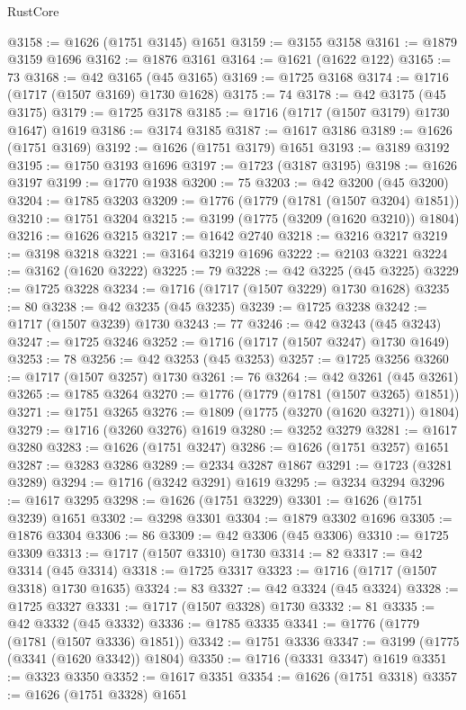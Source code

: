 \begin{lexlean}{RustCore}
\begin{coremodule}
@3158 := @1626 (@1751 @3145) @1651
@3159 := @3155 @3158
@3161 := @1879 @3159 @1696
@3162 := @1876 @3161
@3164 := @1621 (@1622 @122)
@3165 := 73
@3168 := @42 @3165 (@45 @3165)
@3169 := @1725 @3168
@3174 := @1716 (@1717 (@1507 @3169) @1730 @1628)
@3175 := 74
@3178 := @42 @3175 (@45 @3175)
@3179 := @1725 @3178
@3185 := @1716 (@1717 (@1507 @3179) @1730 @1647) @1619
@3186 := @3174 @3185
@3187 := @1617 @3186
@3189 := @1626 (@1751 @3169)
@3192 := @1626 (@1751 @3179) @1651
@3193 := @3189 @3192
@3195 := @1750 @3193 @1696
@3197 := @1723 (@3187 @3195)
@3198 := @1626 @3197
@3199 := @1770 @1938
@3200 := 75
@3203 := @42 @3200 (@45 @3200)
@3204 := @1785 @3203
@3209 := @1776 (@1779 (@1781 (@1507 @3204) @1851))
@3210 := @1751 @3204
@3215 := @3199 (@1775 (@3209 (@1620 @3210)) @1804)
@3216 := @1626 @3215
@3217 := @1642 @2740
@3218 := @3216 @3217
@3219 := @3198 @3218
@3221 := @3164 @3219 @1696
@3222 := @2103 @3221
@3224 := @3162 (@1620 @3222)
@3225 := 79
@3228 := @42 @3225 (@45 @3225)
@3229 := @1725 @3228
@3234 := @1716 (@1717 (@1507 @3229) @1730 @1628)
@3235 := 80
@3238 := @42 @3235 (@45 @3235)
@3239 := @1725 @3238
@3242 := @1717 (@1507 @3239) @1730
@3243 := 77
@3246 := @42 @3243 (@45 @3243)
@3247 := @1725 @3246
@3252 := @1716 (@1717 (@1507 @3247) @1730 @1649)
@3253 := 78
@3256 := @42 @3253 (@45 @3253)
@3257 := @1725 @3256
@3260 := @1717 (@1507 @3257) @1730
@3261 := 76
@3264 := @42 @3261 (@45 @3261)
@3265 := @1785 @3264
@3270 := @1776 (@1779 (@1781 (@1507 @3265) @1851))
@3271 := @1751 @3265
@3276 := @1809 (@1775 (@3270 (@1620 @3271)) @1804)
@3279 := @1716 (@3260 @3276) @1619
@3280 := @3252 @3279
@3281 := @1617 @3280
@3283 := @1626 (@1751 @3247)
@3286 := @1626 (@1751 @3257) @1651
@3287 := @3283 @3286
@3289 := @2334 @3287 @1867
@3291 := @1723 (@3281 @3289)
@3294 := @1716 (@3242 @3291) @1619
@3295 := @3234 @3294
@3296 := @1617 @3295
@3298 := @1626 (@1751 @3229)
@3301 := @1626 (@1751 @3239) @1651
@3302 := @3298 @3301
@3304 := @1879 @3302 @1696
@3305 := @1876 @3304
@3306 := 86
@3309 := @42 @3306 (@45 @3306)
@3310 := @1725 @3309
@3313 := @1717 (@1507 @3310) @1730
@3314 := 82
@3317 := @42 @3314 (@45 @3314)
@3318 := @1725 @3317
@3323 := @1716 (@1717 (@1507 @3318) @1730 @1635)
@3324 := 83
@3327 := @42 @3324 (@45 @3324)
@3328 := @1725 @3327
@3331 := @1717 (@1507 @3328) @1730
@3332 := 81
@3335 := @42 @3332 (@45 @3332)
@3336 := @1785 @3335
@3341 := @1776 (@1779 (@1781 (@1507 @3336) @1851))
@3342 := @1751 @3336
@3347 := @3199 (@1775 (@3341 (@1620 @3342)) @1804)
@3350 := @1716 (@3331 @3347) @1619
@3351 := @3323 @3350
@3352 := @1617 @3351
@3354 := @1626 (@1751 @3318)
@3357 := @1626 (@1751 @3328) @1651

\end{coremodule}
\end{lexlean}
